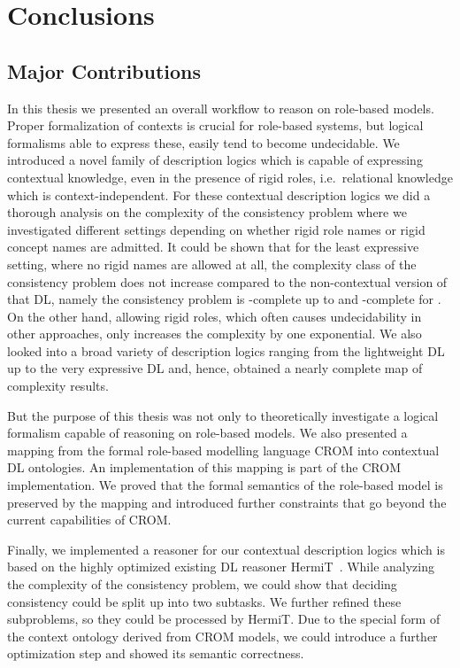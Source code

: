\chapter{Conclusions}
\label{cha:conclusions}


\section{Major Contributions}
\label{sec:major-contributions}

In this thesis we presented an overall workflow to reason on role-based models. Proper formalization
of contexts is crucial for role-based systems, but logical formalisms able to express these, easily
tend to become undecidable.  We introduced a novel family of description logics which is capable of
expressing contextual knowledge, even in the presence of rigid roles, i.e.\ relational knowledge
which is context-independent.  For these contextual description logics we did a thorough analysis on
the complexity of the consistency problem where we investigated different settings depending on
whether rigid role names or rigid concept names are admitted. It could be shown that for the least
expressive setting, where no rigid names are allowed at all, the complexity class of the consistency
problem does not increase compared to the non-contextual version of that DL, namely the consistency
problem is \ExpTime-complete up to \SHOQSHOQ and \NExpTime-complete for \SHOIQSHOIQ. On the other
hand, allowing rigid roles, which often causes undecidability in other approaches, only increases
the complexity by one exponential.
%
We also looked into a broad variety of description logics
ranging from the lightweight DL \EL up to the very expressive DL \SHOIQ and, hence, obtained a
nearly complete map of complexity results.

But the purpose of this thesis was not only to theoretically investigate a logical formalism capable
of reasoning on role-based models. We also presented a mapping from the formal role-based modelling
language CROM into contextual DL ontologies. An implementation of this mapping is part of the CROM
implementation. We proved that the formal semantics of the role-based model is preserved
by the mapping and introduced further constraints that go beyond the current capabilities of CROM.

Finally, we implemented a reasoner for our contextual description logics which is based on the
highly optimized existing DL reasoner HermiT~\cite{GHM-JAR14}.  While analyzing the complexity of
the consistency problem, we could show that deciding consistency could be split up into two
subtasks. We further refined these subproblems, so they could be processed by HermiT.  Due to the
special form of the context ontology derived from CROM models, we could introduce a further
optimization step and showed its semantic correctness.




